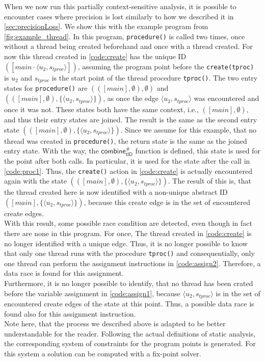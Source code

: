   When we now run this partially context-sensitive analysis, it is possible to encounter cases where precision is lost similarly to how we described it in \autoref{sec:precisionLoss}. We show this with the example program from \autoref{fig:example_thread}. In this program, \texttt{procedure()} is called two times, once without a thread being created beforehand and once with a thread created. For now this thread created in \autoref{code:create} has the unique ID $([main \cdot \langle u_2, s_{tproc} \rangle])$, assuming the program point before the \texttt{create(tproc)} is $u_2$ and $s_{tproc}$ is the start point of the thread procedure \texttt{tproc()}. The two entry states for \texttt{procedure()} are $(([main], \emptyset), \emptyset)$ and $(([main], \emptyset), \{\langle u_2, s_{tproc} \rangle\})$, as once the edge $\langle u_2, s_{tproc} \rangle$ was encountered and once it was not. These states both have the same context, i.e., $([main], \emptyset)$, and thus their entry states are joined. The result is the same as the second entry state $(([main], \emptyset), \{\langle u_2, s_{tproc} \rangle\})$. Since we assume for this example, that no thread was created in \texttt{procedure()}, the return state is the same as the joined entry state. With the way, the $\textsf{combine}^{\#}_\textsf{tID}$ function is defined, this state is used for the point after both calls. In particular, it is used for the state after the call in \autoref{code:proc1}. Thus, the \texttt{create()} action in \autoref{code:create} is actually encountered again with the state $(([main], \emptyset), \{\langle u_2, s_{tproc} \rangle\})$. The result of this is, that the thread created here is now identified with a non-unique abstract ID $([main], \{\langle u_2, s_{tproc} \rangle\})$, because this create edge is in the set of encountered create edges.\\
  With this result, some possible race condition are detected, even though in fact there are none in this program. For once, The thread created in \autoref{code:create} is no longer identified with a unique edge. Thus, it is no longer possible to know that only one thread runs with the procedure \texttt{tproc()} and consequentially, only one thread can perform the assignment instructions in \autoref{code:assign2}. Therefore, a data race is found for this assignment.\\
  Furthermore, it is no longer possible to identify, that no thread has been crated before the variable assignment in \autoref{code:assign1}, because $\langle u_2, s_{tproc} \rangle$ is in the set of encountered create edges of the state at this point. Thus, a possible data race is found also for this assignment instruction.\\
  Note here, that the process we described above is adapted to be better understandable for the reader. Following the actual definitions of static analysis, the corresponding system of constraints for the program points is generated. For this system a solution can be computed with a fix-point solver.\\

